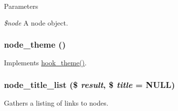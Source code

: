 \begin{DoxyParams}{Parameters}
\item[{\em \$node}]A node object. \end{DoxyParams}
\hypertarget{node_8module_a91c71dff56ba2e39ee5f0233916bca08}{
\subsubsection[{node\_\-theme}]{\setlength{\rightskip}{0pt plus 5cm}node\_\-theme ()}}
\label{node_8module_a91c71dff56ba2e39ee5f0233916bca08}
Implements \hyperlink{group__hooks_ga013ccb45c7aaab1c16cf9691428c910d}{hook\_\-theme()}. \hypertarget{node_8module_a5360ff37933a1c73adce0602395ddbea}{
\subsubsection[{node\_\-title\_\-list}]{\setlength{\rightskip}{0pt plus 5cm}node\_\-title\_\-list (\$ {\em result}, \/  \$ {\em title} = {\ttfamily NULL})}}
\label{node_8module_a5360ff37933a1c73adce0602395ddbea}
Gathers a listing of links to nodes.


